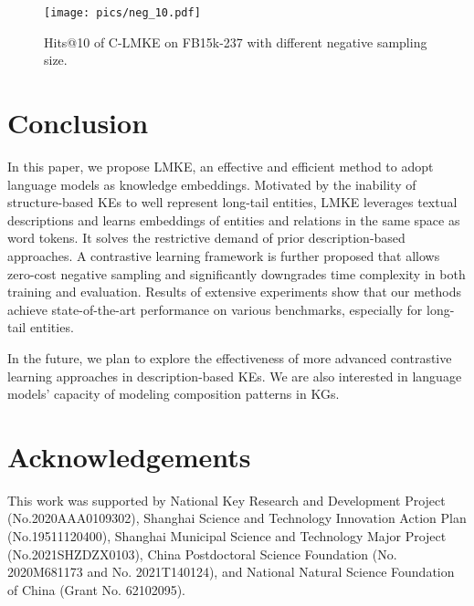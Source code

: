 \documentclass{article}
\newcommand{\wxt}[1]{{#1}}
\begin{document}
\begin{figure}[htbp]
    \centering
        \texttt{[image: pics/neg\_10.pdf]}
    \caption{Hits@10 of C-LMKE on FB15k-237 with different negative sampling size. }\label{fig:nss}
\end{figure}


\section{Conclusion}


In this paper, we propose LMKE, an effective and efficient method to adopt language models as  knowledge embeddings. 
Motivated by the inability of structure-based KEs to well represent long-tail entities, LMKE leverages textual descriptions and learns embeddings of entities and relations in the same space as word tokens.
It solves the restrictive demand of prior description-based approaches.   
A contrastive learning framework is further proposed that allows zero-cost negative sampling and  significantly downgrades time complexity in both training and evaluation. 
Results of extensive experiments show that our methods achieve state-of-the-art performance on various benchmarks, especially for long-tail entities. 



In the future, we plan to explore the effectiveness of more \wxt{advanced} contrastive learning approaches 
in description-based KEs. \wxt{We are also interested in language models' capacity of modeling composition patterns in KGs.}





\section*{Acknowledgements}
This work was supported by National Key Research and Development Project
(No.2020AAA0109302), Shanghai Science and Technology Innovation Action Plan (No.19511120400), Shanghai Municipal Science
and Technology Major Project (No.2021SHZDZX0103), China Postdoctoral Science Foundation (No. 2020M681173 and No. 2021T140124), and National Natural Science Foundation of China (Grant No. 62102095).




\end{document}
